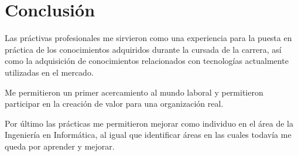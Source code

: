 \section{Conclusión}
Las práctivas profesionales me sirvieron como una experiencia para la puesta en práctica de los conocimientos adquiridos durante la cursada de la carrera, así como la adquisición de conocimientos relacionados con tecnologías actualmente utilizadas en el mercado. 

Me permitieron un primer acercamiento al mundo laboral y permitieron participar en la creación de valor para una organización real.

Por último las prácticas me permitieron mejorar como individuo en el área de la Ingeniería en Informática, al igual que identificar áreas en las cuales todavía me queda por aprender y mejorar.
